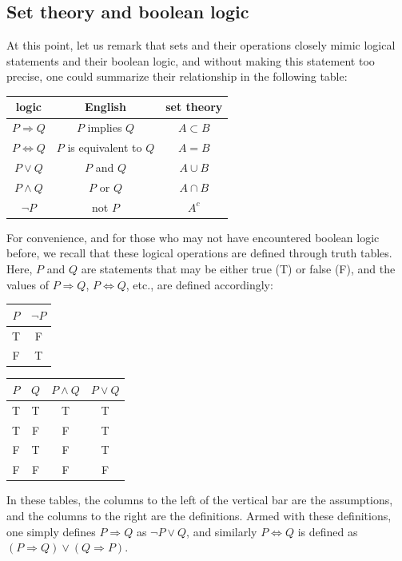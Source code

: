 \subsection{Set theory and boolean logic}
At this point, let us remark that sets and their operations closely mimic logical statements and their boolean logic, and without making this statement too precise, one could summarize their relationship in the following table:

\begin{center}
\begin{tabular}{ccc}
  logic & English & set theory \\
  \hline
  $P \Rightarrow Q$ & $P$ implies $Q$ & $A \subset B$ \\
  $P \Leftrightarrow Q$ & $P$ is equivalent to $Q$ & $A = B$ \\
  $P \vee Q$ & $P$ and $Q$ & $A \cup B$ \\
  $P \wedge Q$ & $P$ or $Q$ & $A\cap B$ \\
  $\neg P$ & not $P$ & $A^c$
\end{tabular}
\end{center}

For convenience, and for those who may not have encountered boolean logic before, we recall that these logical operations are defined through truth tables. Here, $P$ and $Q$ are statements that may be either true (T) or false (F), and the values of $P \Rightarrow Q$, $P \Leftrightarrow Q$, etc., are defined accordingly:
\begin{center}
\begin{tabular}{c|c}
  $P$ & $\neg P$ \\
  \hline
  T & F \\
  F & T
\end{tabular}
\quad \quad
\begin{tabular}{cc|cc}
  $P$ & $Q$ & $P \wedge Q$ & $P \vee Q$ \\
  \hline
  T & T & T & T \\
  T & F & F & T \\
  F & T & F & T \\
  F & F & F & F
\end{tabular}
\end{center}

In these tables, the columns to the left of the vertical bar are the assumptions, and the columns to the right are the definitions. Armed with these definitions, one simply defines $P \Rightarrow Q$ as $\neg P \vee Q$, and similarly $P \Leftrightarrow Q$ is defined as $(P \Rightarrow Q) \vee (Q \Rightarrow P)$.

